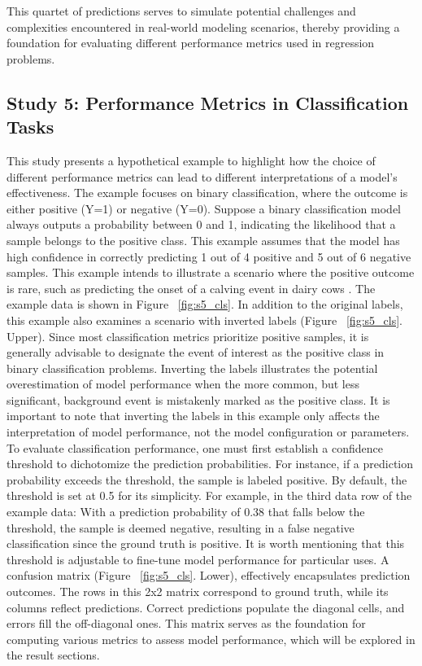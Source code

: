 This quartet of predictions serves to simulate potential challenges and complexities encountered in real-world modeling scenarios, thereby providing a foundation for evaluating different performance metrics used in regression problems.

\subsection{Study 5: Performance Metrics in Classification Tasks}

This study presents a hypothetical example to highlight how the choice of different performance metrics can lead to different interpretations of a model's effectiveness. The example focuses on binary classification, where the outcome is either positive (Y=1) or negative (Y=0). Suppose a binary classification model always outputs a probability between 0 and 1, indicating the likelihood that a sample belongs to the positive class. This example assumes that the model has high confidence in correctly predicting 1 out of 4 positive and 5 out of 6 negative samples. This example intends to illustrate a scenario where the positive outcome is rare, such as predicting the onset of a calving event in dairy cows \citep{ouellet_evaluation_2016,borchers_machine-learning-based_2017}. The example data is shown in Figure ~\ref{fig:s5_cls}. In addition to the original labels, this example also examines a scenario with inverted labels (Figure ~\ref{fig:s5_cls}. Upper). Since most classification metrics prioritize positive samples, it is generally advisable to designate the event of interest as the positive class in binary classification problems. Inverting the labels illustrates the potential overestimation of model performance when the more common, but less significant, background event is mistakenly marked as the positive class. It is important to note that inverting the labels in this example only affects the interpretation of model performance, not the model configuration or parameters.
To evaluate classification performance, one must first establish a confidence threshold to dichotomize the prediction probabilities. For instance, if a prediction probability exceeds the threshold, the sample is labeled positive. By default, the threshold is set at 0.5 for its simplicity. For example, in the third data row of the example data: With a prediction probability of 0.38 that falls below the threshold, the sample is deemed negative, resulting in a false negative classification since the ground truth is positive. It is worth mentioning that this threshold is adjustable to fine-tune model performance for particular uses. A confusion matrix (Figure ~\ref{fig:s5_cls}. Lower), effectively encapsulates prediction outcomes. The rows in this 2x2 matrix correspond to ground truth, while its columns reflect predictions. Correct predictions populate the diagonal cells, and errors fill the off-diagonal ones. This matrix serves as the foundation for computing various metrics to assess model performance, which will be explored in the result sections.

